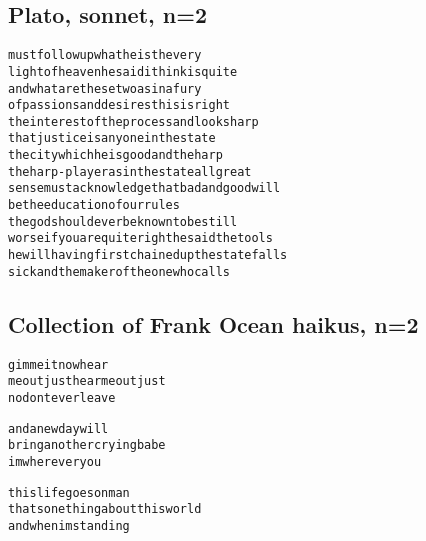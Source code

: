 \documentclass[10pt,twocolumn]{article}
\begin{document}
\begin{appendices}
\subsection{Plato, sonnet, n=2}
\begin{alltt}
must follow up what he is the very
light of heaven he said i think is quite
and what are these two as in a fury
of passions and desires this is right
the interest of the process and look sharp
that justice is any one in the state
the city which he is good and the harp
the harp-player as in the state all great
sense must acknowledge that bad and good will
be the education of our rules
the god should ever be known to be still
worse if you are quite right he said the tools
he will having first chained up the state falls
sick and the maker of the one who calls
\end{alltt}

\subsection{Collection of Frank Ocean haikus, n=2}
\begin{alltt}
gimme it now hear
me out just hear me out just
no dont ever leave

and a new day will
bring another crying babe
im wherever you

this life goes on man
thats one thing about this world
and when im standing
\end{alltt}
\end{appendices}
\end{document}
